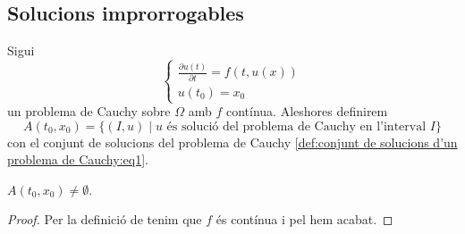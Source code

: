 \documentclass[../Apunts.tex]{subfiles}
\begin{document}
	\subsection{Solucions improrrogables}
	\begin{definition}
		\label{def:conjunt de solucions d'un problema de Cauchy}
		Sigui
		\begin{equation}
			\label{def:conjunt de solucions d'un problema de Cauchy:eq1}
			\begin{cases}
				\displaystyle \frac{\partial u(t)}{\partial t}=f(t,u(x)) \\
				\displaystyle u(t_{0})=x_{0}
			\end{cases}
		\end{equation}
		un problema de Cauchy sobre \(\Omega\) amb \(f\) contínua. Aleshores definirem
		\[A(t_{0},x_{0})=\{(I,u)\mid u\text{ és solució del problema de Cauchy en l'interval }I\}\]
		con el conjunt de solucions del problema de Cauchy \eqref{def:conjunt de solucions d'un problema de Cauchy:eq1}.
	\end{definition}
	\begin{observation}
		\label{obs:el conjunt de solucions d'un problema de Cauchy amb f contínua és no buit}
		\(A(t_{0},x_{0})\neq\emptyset\).
		\begin{proof}
			Per la definició de  tenim que \(f\) és contínua i pel  hem acabat.
		\end{proof}
	\end{observation}
\end{document}
